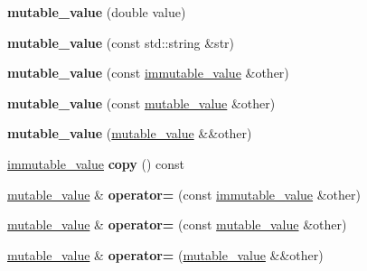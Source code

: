 \begin{DoxyCompactItemize}
{\bfseries mutable\+\_\+value} (double value)
\item 
\mbox{\label{classdialog_1_1mutable__value_a942994748f636c383f1ab3897326a4e0}} 
{\bfseries mutable\+\_\+value} (const std\+::string \&str)
\item 
\mbox{\label{classdialog_1_1mutable__value_a074757ebe0c418a29855aa0527ae80ce}} 
{\bfseries mutable\+\_\+value} (const \hyperlink{classdialog_1_1immutable__value}{immutable\+\_\+value} \&other)
\item 
\mbox{\label{classdialog_1_1mutable__value_a23e366956a4881b42eeede3c9a6af94f}} 
{\bfseries mutable\+\_\+value} (const \hyperlink{classdialog_1_1mutable__value}{mutable\+\_\+value} \&other)
\item 
\mbox{\label{classdialog_1_1mutable__value_a29c5f9064177c8c673306e7f3b09acdf}} 
{\bfseries mutable\+\_\+value} (\hyperlink{classdialog_1_1mutable__value}{mutable\+\_\+value} \&\&other)
\item 
\mbox{\label{classdialog_1_1mutable__value_aba4b910ac731fb8dbbda211fa918c443}} 
\hyperlink{classdialog_1_1immutable__value}{immutable\+\_\+value} {\bfseries copy} () const
\item 
\mbox{\label{classdialog_1_1mutable__value_a0fcb8afa5afa9d4c3384035cdba66d32}} 
\hyperlink{classdialog_1_1mutable__value}{mutable\+\_\+value} \& {\bfseries operator=} (const \hyperlink{classdialog_1_1immutable__value}{immutable\+\_\+value} \&other)
\item 
\mbox{\label{classdialog_1_1mutable__value_a513fe862f5ed5b0fc3cb37513b1b80a1}} 
\hyperlink{classdialog_1_1mutable__value}{mutable\+\_\+value} \& {\bfseries operator=} (const \hyperlink{classdialog_1_1mutable__value}{mutable\+\_\+value} \&other)
\item 
\mbox{\label{classdialog_1_1mutable__value_a42b1a9dc82410c8b082950e4238cdbed}} 
\hyperlink{classdialog_1_1mutable__value}{mutable\+\_\+value} \& {\bfseries operator=} (\hyperlink{classdialog_1_1mutable__value}{mutable\+\_\+value} \&\&other)
\end{DoxyCompactItemize}
